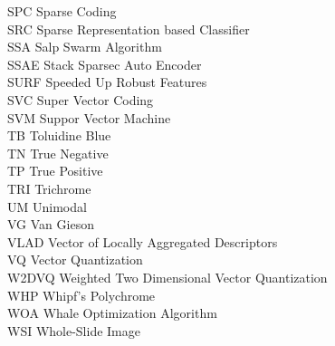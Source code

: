 \begin{nomenclature}
\begin{tabbing}
SPC	\> \quad \quad\quad	Sparse Coding	\\
SRC	\> \quad \quad\quad	Sparse Representation based Classifier	\\
SSA	\> \quad \quad\quad	Salp Swarm Algorithm	\\
SSAE	\> \quad \quad\quad	Stack Sparsec Auto Encoder	\\
SURF	\> \quad \quad\quad	 Speeded Up Robust Features	\\
SVC	\> \quad \quad\quad	Super Vector Coding	\\
SVM	\> \quad \quad\quad	Suppor Vector Machine	\\
TB	\> \quad \quad\quad	Toluidine Blue	\\
TN	\> \quad \quad\quad	True Negative	\\
TP	\> \quad \quad\quad	True Positive	\\
TRI	\> \quad \quad\quad	Trichrome	\\
UM	\> \quad \quad\quad	Unimodal	\\
VG	\> \quad \quad\quad	Van Gieson	\\
VLAD	\> \quad \quad\quad	Vector of Locally Aggregated Descriptors	\\
VQ	\> \quad \quad\quad	Vector Quantization	\\
W2DVQ	\> \quad \quad\quad	Weighted Two Dimensional Vector Quantization	\\
WHP	\> \quad \quad\quad	Whipf’s Polychrome	\\
WOA	\> \quad \quad\quad	Whale Optimization Algorithm	\\
WSI	\> \quad \quad\quad	Whole-Slide Image	\\



\end{tabbing}

\end{nomenclature} 